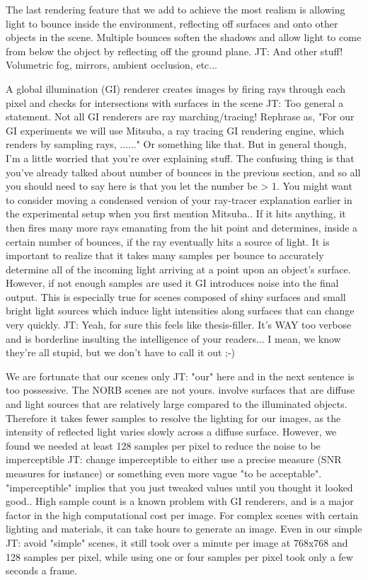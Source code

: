 \documentclass[10pt,twocolumn,letterpaper]{article}
\newcommand{\tompson}[1]{{\color{green} JT: #1}}
\begin{document}
The last rendering feature that we add to achieve the most realism is allowing light to bounce inside the environment, reflecting off surfaces and onto other objects in the scene.  Multiple bounces soften the shadows and allow light to come from below the object by reflecting off the ground plane. \tompson{And other stuff! Volumetric fog, mirrors, ambient occlusion, etc...}

A global illumination (GI) renderer creates images by firing rays through each pixel and checks for intersections with surfaces in the scene \tompson{Too general a statement. Not all GI renderers are ray marching/tracing! Rephrase as, "For our GI experiments we will use Mitsuba, a ray tracing GI rendering engine, which renders by sampling rays, ......" Or something like that. But in general though, I'm a little worried that you're over explaining stuff. The confusing thing is that you've already talked about number of bounces in the previous section, and so all you should need to say here is that you let the number be > 1. You might want to consider moving a condensed version of your ray-tracer explanation earlier in the experimental setup when you first mention Mitsuba.}.  If it hits anything, it then fires many more rays emanating from the hit point and determines, inside a certain number of bounces, if the ray eventually hits a source of light.  It is important to realize that it takes many samples per bounce to accurately determine all of the incoming light arriving at a point upon an object's surface.
However, if not enough samples are used it GI introduces noise into the final output. This is especially true for scenes composed of shiny surfaces and small bright light sources which induce light intensities along surfaces that can change very quickly. \tompson{Yeah, for sure this feels like thesis-filler. It's WAY too verbose and is borderline insulting the intelligence of your readers...  I mean, we know they're all stupid, but we don't have to call it out ;-)}

We are fortunate that our scenes only \tompson{"our" here and in the next sentence is too possessive. The NORB scenes are not yours.} involve surfaces that are diffuse and light sources that are relatively large compared to the illuminated objects.  Therefore it takes fewer samples to resolve the lighting for our images, as the intensity of reflected light varies slowly across a diffuse surface.  However, we found we needed at least 128 samples per pixel to reduce the noise to be imperceptible \tompson{change imperceptible to either use a precise measure (SNR measures for instance) or something even more vague "to be acceptable". "imperceptible" implies that you just tweaked values until you thought it looked good.}. High sample count is a known problem with GI renderers, and is a major factor in the high computational cost per image.  For complex scenes with certain lighting and materials, it can take hours to generate an image.  Even in our simple \tompson{avoid "simple"} scenes, it still took over a minute per image at 768x768 and 128 samples per pixel, while using one or four samples per pixel took only a few seconds a frame.
\end{document}
